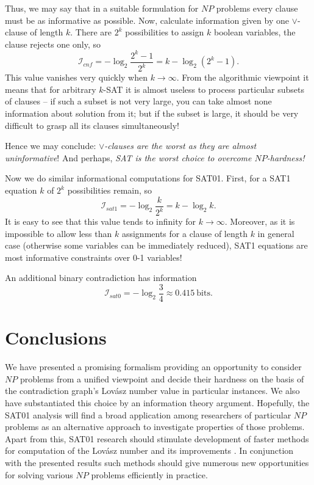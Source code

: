 \documentclass[11pt]{article}
\begin{document}
Thus, we may say that in a suitable formulation for $NP$ problems every clause must be as informative as possible. Now, calculate information given by one $\lor$-clause of length $k$. There are $2^k$ possibilities to assign $k$ boolean variables, the clause rejects one only, so
\begin{equation}
\label{eq:Icnf}
\mathcal{I}_{cnf} = -\log_2 \frac{2^k-1}{2^k} = k - \log_2 (2^k-1).
\end{equation}
This value vanishes very quickly when $k \to \infty$. From the algorithmic viewpoint it means that for arbitrary $k$-SAT it is almost useless to process particular subsets of clauses -- if such a subset is not very large, you can take almost none information about solution from it; but if the subset is large, it should be very difficult to grasp all its clauses simultaneously!

Hence we may conclude: {\em $\lor$-clauses are the worst as they are almost uninformative}! And perhaps, {\em SAT is the worst choice to overcome $NP$-hardness!}

Now we do similar informational computations for SAT01. First, for a SAT1 equation $k$ of $2^k$ possibilities remain, so
\begin{equation}
\label{eq:Isat1}
\mathcal{I}_{sat1} = -\log_2 \frac{k}{2^k} = k - \log_2 k.
\end{equation}
It is easy to see that this value tends to infinity for $k \to \infty$. Moreover, as it is impossible to allow less than $k$ assignments for a clause of length $k$ in general case (otherwise some variables can be immediately reduced), SAT1 equations are most informative constraints over 0-1 variables!

An additional binary contradiction has information
\begin{equation}
\label{eq:Isat0}
\mathcal{I}_{sat0} = -\log_2 \frac{3}{4} \approx 0.415 \ \textrm{bits.}
\end{equation}

\section{Conclusions}
We have presented a promising formalism providing an opportunity to consider $NP$ problems from a unified viewpoint and decide their hardness on the basis of the contradiction graph's Lov\'asz number value in particular instances. We also have substantiated this choice by an information theory argument. Hopefully, the SAT01 analysis will find a broad application among researchers of particular $NP$ problems as an alternative approach to investigate properties of those problems. Apart from this, SAT01 research should stimulate development of faster methods for computation of the Lov\'asz number and its improvements \cite{LS91,KP01}. In conjunction with the presented results such methods should give numerous new opportunities for solving various $NP$ problems efficiently in practice.
\end{document}
